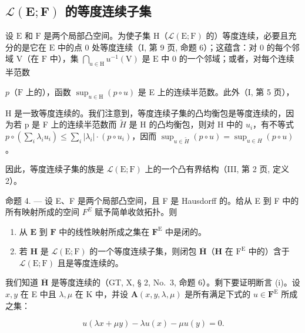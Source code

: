 \subsection{\texorpdfstring{\(\mathcal{L}(\mathbf{E};\mathbf{F})\) 的等度连续子集}{\textbackslash mathcal\{L\}(\textbackslash mathbf\{E\};\textbackslash mathbf\{F\}) 的等度连续子集}}

设 \(\mathrm{E}\) 和 \(\mathrm{F}\) 是两个局部凸空间。为使子集 \(\mathrm{H}\)（\(\mathcal{L}(\mathrm{E};\mathrm{F})\) 的）等度连续，必要且充分的是它在 \(\mathrm{E}\) 中的点 0 处等度连续（I, 第 9 页, 命题 6）；这蕴含：对 0 的每个邻域 \(\mathrm{V}\)（在 \(\mathrm{F}\) 中），集 \(\bigcap_{u\in \mathrm{H}}u^{-1}(\mathrm{V})\) 是 \(\mathrm{E}\) 中 0 的一个邻域；或者，对每个连续半范数

\(p\)（\(\mathrm{F}\) 上的），函数 \(\sup_{u\in \mathrm{H}}(p\circ u)\) 是 E 上的连续半范数。此外（I, 第 5 页），

  H 是一致等度连续的。我们注意到，等度连续子集的凸均衡包是等度连续的，因为若 p 是 F 上的连续半范数而 \(\tilde{H}\) 是 H 的凸均衡包，则对 H 中的 \(u_{i}\)，有不等式 \(p \circ (\sum_{i} \lambda_{i} u_{i}) \leqslant \sum_{i} |\lambda_{i}| \cdot (p \circ u_{i})\)，因而 \(\sup_{u \in \tilde{H}} (p \circ u) = \sup_{u \in H} (p \circ u)\)。

因此，等度连续子集的族是 \(\mathcal{L}(\mathrm{E};\mathrm{F})\) 上的一个凸有界结构（III, 第 2 页, 定义 2）。

命题 4. --- 设 E、F 是两个局部凸空间，且 F 是 Hausdorff 的。给从 E 到 F 中的所有映射所成的空间 \(F^{E}\) 赋予简单收敛拓扑。则

\begin{enumerate}
\def\labelenumi{(\roman{enumi})}
\item
  从 \(\mathbf{E}\) 到 \(\mathbf{F}\) 中的线性映射所成之集在 \(\mathbf{F}^{\mathrm{E}}\) 中是闭的。
\item
  若 \(\mathbf{H}\) 是 \(\mathcal{L}(\mathrm{E};\mathrm{F})\) 的一个等度连续子集，则闭包 \(\overline{\mathbf{H}}\)（\(\mathbf{H}\) 在 \(\mathrm{F}^{\mathrm{E}}\) 中的）含于 \(\mathcal{L}(\mathrm{E};\mathrm{F})\) 且是等度连续的。
\end{enumerate}

我们知道 \(\overline{\mathbf{H}}\) 是等度连续的（GT, X, § 2, No.~3, 命题 6）。剩下要证明断言 (i)。设 \(x, y\) 在 E 中且 \(\lambda, \mu\) 在 K 中，并设 \(\mathbf{A}(x, y, \lambda, \mu)\) 是所有满足下式的 \(u \in \mathbf{F}^{\mathrm{E}}\) 所成之集：

\[
u (\lambda x + \mu y) - \lambda u (x) - \mu u (y) = 0.
\]

